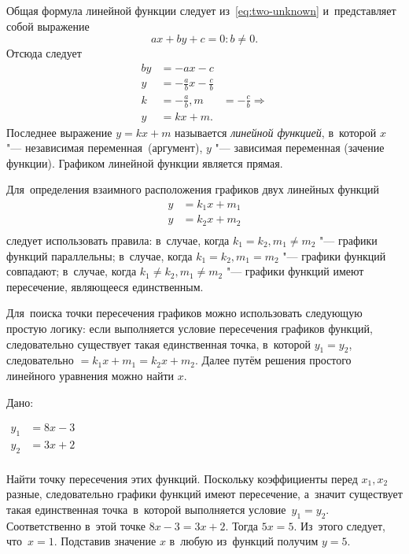 \documentclass[]{scrartcl}
\begin{document}
{{Общая формула линейной функции следует из~\ref{eq:two-unknown} и~представляет собой выражение
\begin{equation}\label{eq:linear-func-1}
ax+by+c=0: b\neq 0.
\end{equation}
Отсюда следует
\begin{equation}\label{eq:linear-func-2}
	\begin{aligned}
		by &= -ax-c\\
		y &= -\frac{a}{b}x - \frac{c}{b}\\
		k &= -\frac{a}{b}, m &= -\frac{c}{b} \Rightarrow \\
		y &= kx+m. 
	\end{aligned}
\end{equation}
Последнее выражение $y=kx+m$ называется \emph{линейной функцией}, в~которой $x$ "--- независимая переменная~(аргумент), $y$ "--- зависимая переменная (зачение функции). Графиком линейной функции является прямая.

Для~определения взаимного расположения графиков двух линейных функций
\begin{equation*}\label{eq:linear-func-3}
\begin{aligned}
y&=k_{1}x+m_1\\
y&=k_{2}x+m_2\\
\end{aligned}
\end{equation*}
следует использовать правила: в~случае, когда $k_1=k_2, m_1 \neq m_2$ "--- графики функций параллельны; в~случае, когда $k_1=k_2, m_1=m_2$ "--- графики функций совпадают; в~случае, когда $k_1 \neq k_2, m_1 \neq m_2$ "--- графики функций имеют пересечение, являющееся единственным. 

Для~поиска точки пересечения графиков можно использовать следующую простую логику: если выполняется условие пересечения графиков функций, следовательно существует такая единственная точка, в~которой $y_1=y_2$, следовательно $=k_{1}x+m_1 = k_{2}x+m_2$. Далее путём решения простого линейного уравнения можно найти $x$.

\begin{Thexmpl}\label{ex:two-linear-1}
	Дано:
	
	$\begin{aligned}
	y_{1}&=8x - 3\\
	y_{2}&=3x + 2\\
	\end{aligned}$
	
	Найти точку пересечения этих функций. Поскольку коэффициенты перед $x_1, x_2$ разные, следовательно графики функций имеют пересечение, а~значит существует такая единственная точка~в~которой выполняется условие~$y_1=y_2$. Соответственно в~этой точке $8x - 3 = 3x + 2$. Тогда $5x=5$. Из~этого следует, что~$x=1$. Подставив значение $x$ в~любую из~функций получим $y=5$.
	

\end{Thexmpl}}}
\end{document}
